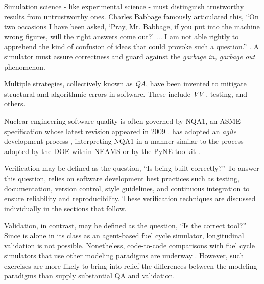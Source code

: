 
Simulation science - like experimental science - must distinguish trustworthy
results from untrustworthy ones.
Charles Babbage famously articulated this, ``On two occasions I have been asked,
`Pray, Mr. Babbage, if you put into the machine wrong figures, will the right
answers come out?' ... I am not able rightly to apprehend the kind of confusion
of ideas that could provoke such a question.'' \cite{babbage_passages_2011}.
A simulator must assure correctness and guard against the \emph{garbage
in, garbage out} phenomenon.

Multiple strategies, collectively known as \emph{\gls{QA}}, have
been invented to mitigate structural and algorithmic errors
in software. These include \emph{\gls{VV}}
\cite{boehm_software_1989}, testing, and others.

Nuclear engineering software quality is often governed by \gls{NQA1}, an
\gls{ASME} specification
whose latest revision appeared in 2009 \cite{asme_nqa-1a-2009_2009}.
\Cyclus has adopted an \emph{agile} development process
\cite{larman_agile_2004},
interpreting \gls{NQA1} in a manner similar to the process adopted by the
\gls{DOE} within \gls{NEAMS} \cite{neams_nuclear_2013} or by the PyNE toolkit
\cite{biondo_quality_2014}.

Verification may be defined as the question, ``Is \Cyclus being built correctly?''
To answer this question, \Cyclus relies on software development best practices
such as testing,
documentation, version control, style guidelines, and continuous integration to
ensure reliability and reproducibility. These verification techniques are
discussed individually in the sections that follow.

Validation, in contrast,  may be defined as the question,
``Is \Cyclus the correct tool?''
Since \Cyclus is alone in its class as an agent-based fuel cycle simulator, longitudinal
validation is not possible. Nonetheless, code-to-code comparisons with fuel cycle
simulators that use other modeling paradigms are underway
\cite{huff_extensions_2014}. However, such
exercises are more likely to bring into relief the differences between the modeling
paradigms than supply substantial \gls{QA} and validation.

